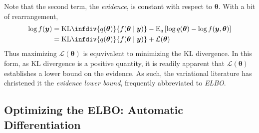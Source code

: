     Note that the second term, the \emph{evidence}, is constant with respect to 
    $\bm{\theta}$.  With a bit of rearrangement,
    \[
        \begin{aligned}
        \log f(\bm{y}) 
            &= \text{KL}\infdiv{q(\bm{\theta})}{f(\bm{\theta}\mid\bm{y})}
                - \text{E}_q\left[
                \log q(\bm{\theta}) - \log f(\bm{y},\bm{\theta})
                \right]\\
            &= \text{KL}\infdiv{q(\bm{\theta})}{f(\bm{\theta}\mid\bm{y})}
                + \mathcal{L}(\bm{\theta})
        \end{aligned}
    \]
    Thus maximizing $\mathcal{L}(\bm{\theta})$ is equvivalent to minimizing the 
    KL divergence. In this form, as KL divergence is a positive quantity, it is
    readily apparent that $\mathcal{L}(\bm{\theta})$ establishes a lower bound
    on the evidence.  As such, the variational literature has christened it the
    \emph{evidence lower bound}, frequently abbreviated to \emph{ELBO}.
    
\subsection{Optimizing the ELBO: Automatic Differentiation}

